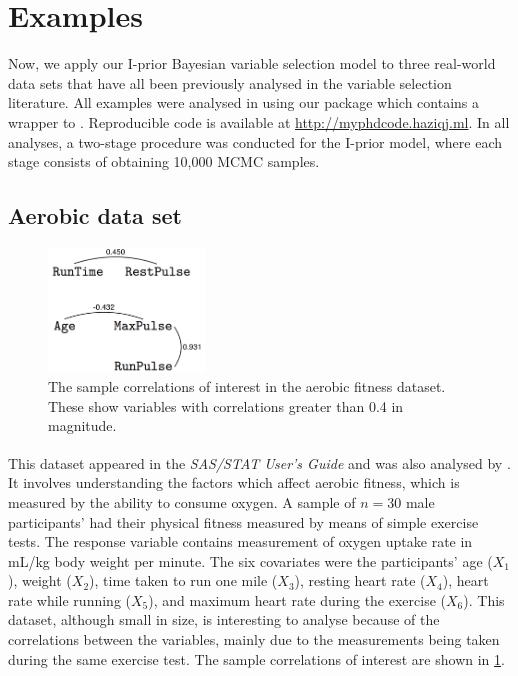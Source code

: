 \documentclass[11pt,twoside,openright]{report}
\begin{document}
\section{Examples}

\vspace{-1mm}
Now, we apply our I-prior Bayesian variable selection model to three real-world data sets that have all been previously analysed in the variable selection literature.
All examples were analysed in  using our  package \citep{jamil2018ripriorBVS} which contains a wrapper to  \citep{plummer2003jags}.
Reproducible code is available at \url{http://myphdcode.haziqj.ml}.
In all analyses, a two-stage procedure was conducted for the I-prior model, where each stage consists of obtaining 10,000 MCMC samples.

\vspace{-1mm}
\subsection{Aerobic data set}
\label{sec:aerobicbvs}

\begin{figure}[htb]
	\centering
	\includegraphics[height=1.3in]{figure/aerobic-cor}
	\caption[The sample correlations of interest in the aerobic fitness dataset]{The sample correlations of interest in the aerobic fitness dataset. These show variables with correlations greater than 0.4 in magnitude. \label{fig:aerobic-cor}}
\end{figure}

This dataset appeared in the \textit{SAS/STAT\textsuperscript{\textregistered} User's Guide} \citep{SAS2008} and was also analysed by \citet{Kuo1998}. 
It involves understanding the factors which affect aerobic fitness, which is measured by the ability to consume oxygen. 
A sample of $n=30$ male participants' had their physical fitness measured by means of simple exercise tests. 
The response variable contains measurement of oxygen uptake rate in mL/kg body weight per minute. 
The six covariates were the participants' age ($X_1$), weight ($X_2$), time taken to run one mile ($X_3$), resting heart rate ($X_4$), heart rate while running ($X_5$), and maximum heart rate during the exercise ($X_6$). 
This dataset, although small in size, is interesting to analyse because of the correlations between the variables, mainly due to the measurements being taken during the same exercise test. 
The sample correlations of interest are shown in \cref{fig:aerobic-cor}.
\end{document}

